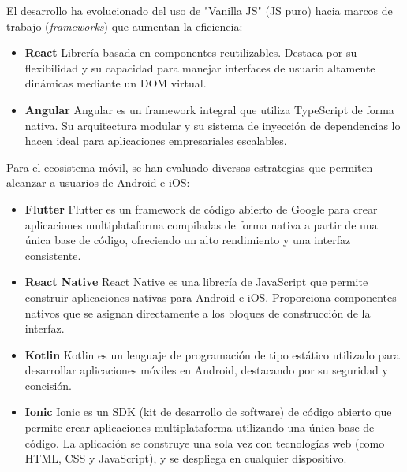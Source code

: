 El desarrollo ha evolucionado del uso de "Vanilla JS" (JS puro) hacia marcos de trabajo (\textit{\hyperlink{marcosTrabajo}{frameworks}}) 
que aumentan la eficiencia:

\begin{itemize}
    \item \textbf{React} \cite{react}
    \newline
    Librería basada en componentes reutilizables. Destaca por su flexibilidad y su capacidad para manejar interfaces 
    de usuario altamente dinámicas mediante un DOM virtual.

    \item \textbf{Angular} \cite{angular}
    \newline
    Angular es un framework integral que utiliza TypeScript de forma nativa. Su arquitectura modular y su sistema de 
    inyección de dependencias lo hacen ideal para aplicaciones empresariales escalables.
\end{itemize}

Para el ecosistema móvil, se han evaluado diversas estrategias que permiten alcanzar a usuarios de Android e iOS:

\begin{itemize}
    \item \textbf{Flutter} \cite{flutter}
    \newline
    Flutter es un framework de código abierto de Google para crear aplicaciones multiplataforma compiladas de forma 
    nativa a partir de una única base de código, ofreciendo un alto rendimiento y una interfaz consistente.

    \item \textbf{React Native} \cite{reactNative}
    \newline
    React Native es una librería de JavaScript que permite construir aplicaciones nativas para Android e iOS. Proporciona 
    componentes nativos que se asignan directamente a los bloques de construcción de la interfaz.

    \item \textbf{Kotlin} \cite{kotlin}
    \newline
    Kotlin es un lenguaje de programación de tipo estático utilizado para desarrollar aplicaciones móviles en Android,
    destacando por su seguridad y concisión.

    \item \textbf{Ionic} \cite{ionic}
    \newline
    Ionic es un SDK (kit de desarrollo de software) de código abierto que permite crear aplicaciones multiplataforma 
    utilizando una única base de código. La aplicación se construye una sola vez con tecnologías web (como HTML, CSS 
    y JavaScript), y se despliega en cualquier dispositivo. 
\end{itemize}

